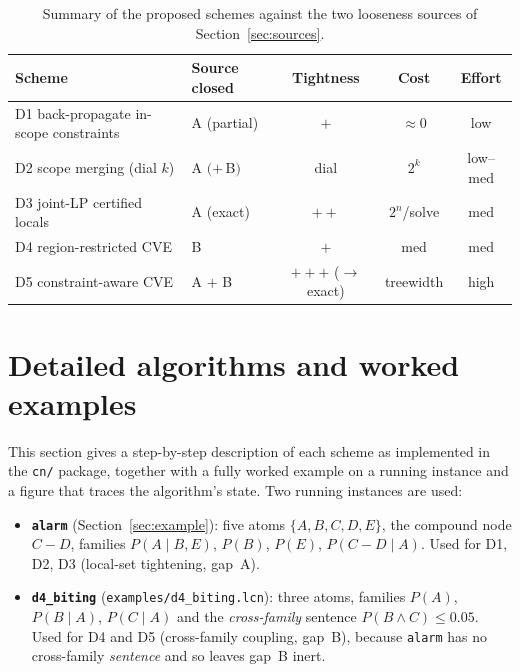 \documentclass[11pt]{article}
\begin{document}
\begin{table}[t]
  \centering
  \begin{tabular}{llccc}
    \toprule
    Scheme & Source closed & Tightness & Cost & Effort \\
    \midrule
    D1 back-propagate in-scope constraints & A (partial) & $+$       & $\approx 0$       & low \\
    D2 scope merging (dial $k$)            & A $(+\,$B$)$ & dial      & $2^k$             & low--med \\
    D3 joint-LP certified locals           & A (exact)    & $++$      & $2^n$/solve       & med \\
    D4 region-restricted CVE               & B            & $+$       & med               & med \\
    D5 constraint-aware CVE                & A $+$ B       & $+{+}{+}$ ($\to$exact) & treewidth & high \\
    \bottomrule
  \end{tabular}
  \caption{Summary of the proposed schemes against the two looseness sources of
    Section~\ref{sec:sources}.}
\end{table}

\section{Detailed algorithms and worked examples}\label{sec:detailed}

This section gives a step-by-step description of each scheme as implemented in the
\texttt{cn/} package, together with a fully worked example on a running instance and a figure
that traces the algorithm's state. Two running instances are used:

\begin{itemize}
  \item \textbf{\texttt{alarm}} (Section~\ref{sec:example}): five atoms $\{A,B,C,D,E\}$, the
    compound node $C\!-\!D$, families $P(A\mid B,E)$, $P(B)$, $P(E)$, $P(C\!-\!D\mid A)$. Used
    for D1, D2, D3 (local-set tightening, gap~A).
  \item \textbf{\texttt{d4\_biting}} (\texttt{examples/d4\_biting.lcn}): three atoms, families
    $P(A)$, $P(B\mid A)$, $P(C\mid A)$ and the \emph{cross-family} sentence
    $P(B\land C)\le 0.05$. Used for D4 and D5 (cross-family coupling, gap~B), because
    \texttt{alarm} has no cross-family \emph{sentence} and so leaves gap~B inert.
\end{itemize}
\end{document}
